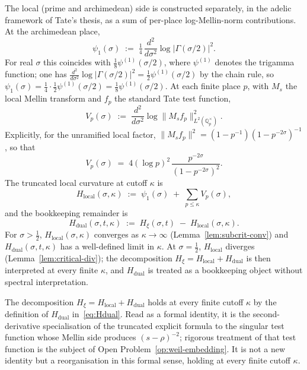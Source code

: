 \documentclass[11pt]{article}
\newcommand{\Hxi}{H_{\xi}}
\newcommand{\Hlocal}{H_{\mathrm{local}}}
\newcommand{\Hdual}{H_{\mathrm{dual}}}
\begin{document}
The local (prime and archimedean) side is constructed
separately, in the adelic framework of Tate's thesis, as a
sum of per-place log-Mellin-norm contributions.
At the archimedean place,
\begin{equation}\label{eq:psi1-def}
\psi_1(\sigma)
\;:=\;\tfrac{1}{4}\,\frac{d^2}{d\sigma^2}
\log\lvert\Gamma(\sigma/2)\rvert^2.
\end{equation}
For real $\sigma$ this coincides with
$\tfrac{1}{8}\psi^{(1)}(\sigma/2)$, where $\psi^{(1)}$
denotes the trigamma function; one has
$\frac{d^2}{d\sigma^2}\log\lvert\Gamma(\sigma/2)\rvert^2
=\tfrac{1}{2}\psi^{(1)}(\sigma/2)$ by the chain rule, so
$\psi_1(\sigma)=\tfrac{1}{4}\cdot\tfrac{1}{2}
\psi^{(1)}(\sigma/2)=\tfrac{1}{8}\psi^{(1)}(\sigma/2)$.
At each finite place $p$, with $M_s$ the local Mellin
transform and $f_p$ the standard Tate test function,
\begin{equation}\label{eq:Vp-def}
V_p(\sigma)\;:=\;\frac{d^2}{d\sigma^2}
\log\lVert M_s f_p\rVert^{2}_{L^{2}(\mathbb{Q}_p^{\times})}.
\end{equation}
Explicitly, for the unramified local factor,
$\lVert M_s f_p\rVert^{2}=(1-p^{-1})(1-p^{-2\sigma})^{-1}$,
so that
\begin{equation}\label{eq:Vp}
V_p(\sigma)
\;=\;4(\log p)^{2}\,
\frac{p^{-2\sigma}}{(1-p^{-2\sigma})^{2}}.
\end{equation}
The truncated local curvature at cutoff $\kappa$ is
\begin{equation}\label{eq:Hlocal}
\Hlocal(\sigma,\kappa)
\;:=\;\psi_1(\sigma)\;+\;\sum_{p\le\kappa}V_p(\sigma),
\end{equation}
and the bookkeeping remainder is
\begin{equation}\label{eq:Hdual}
\Hdual(\sigma,t,\kappa)
\;:=\;\Hxi(\sigma,t)\;-\;\Hlocal(\sigma,\kappa).
\end{equation}
For $\sigma>\tfrac12$, $\Hlocal(\sigma,\kappa)$ converges as
$\kappa\to\infty$ (Lemma~\ref{lem:subcrit-conv}) and
$\Hdual(\sigma,t,\kappa)$ has a well-defined limit in
$\kappa$.
At $\sigma=\tfrac12$, $\Hlocal$ diverges
(Lemma~\ref{lem:critical-div}); the decomposition
$\Hxi=\Hlocal+\Hdual$ is then interpreted at every finite
$\kappa$, and $\Hdual$ is treated as a bookkeeping object
without spectral interpretation.

The decomposition $\Hxi=\Hlocal+\Hdual$ holds at every finite
cutoff $\kappa$ by the definition of $\Hdual$
in~\eqref{eq:Hdual}.
Read as a formal identity, it is the second-derivative
specialisation of the truncated explicit formula to the
singular test function whose Mellin side produces
$(s-\rho)^{-2}$; rigorous treatment of that test function is
the subject of Open Problem~\ref{op:weil-embedding}.
It is not a new identity but a reorganisation in this formal
sense, holding at every finite cutoff $\kappa$.
\end{document}
